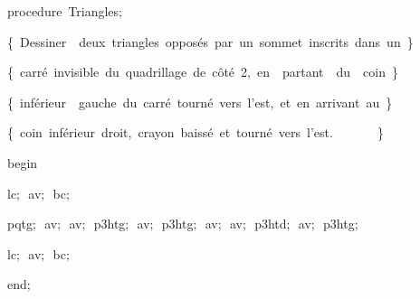 {\pagebreak[3] 
\vspace{\neglskip}\mbox{\blc  \blk\idt  \mcl procedure\idt \ Triangles$;$}\par 
\vspace{\neglskip}\mbox{\blc  \blk\blk\idt  \cmt  \{\ Dessiner\ \ deux\ triangles\ oppos\'{e}s\ par\ un\ sommet\ inscrits\ dans\ un\ \}\idt }\par 
\vspace{\neglskip}\mbox{\blc  \blk\blk\idt  \cmt  \{\ carr\'{e}\ invisible\ du\ quadrillage\ de\ c\^{o}t\'{e}\ 2,\ en\ \ partant\ \ du\ \ coin\ \}\idt }\par 
\vspace{\neglskip}\mbox{\blc  \blk\blk\idt  \cmt  \{\ inf\'{e}rieur\ \ gauche\ du\ carr\'{e}\ tourn\'{e}\ vers\ l{'}est,\ et\ en\ arrivant\ au\ \}\idt }\par 
\vspace{\neglskip}\mbox{\blc  \blk\blk\idt  \cmt  \{\ coin\ inf\'{e}rieur\ droit,\ crayon\ baiss\'{e}\ et\ tourn\'{e}\ vers\ l{'}est.\ \ \ \ \ \ \ \}\idt }\par 
\vspace{\neglskip}\mbox{\blc  \blk\idt  \mcl begin\idt }\par 
\vspace{\neglskip}\mbox{\blc  \blk\blk\idt  lc$;$\ av$;$\ bc$;$}\par 
\vspace{\neglskip}\mbox{\blc  \blk\blk\idt  pqtg$;$\ av$;$\ av$;$\ p3htg$;$\ av$;$\ p3htg$;$\ av$;$\ av$;$\ p3htd$;$\ av$;$\ p3htg$;$}\par 
\vspace{\neglskip}\mbox{\blc  \blk\blk\idt  lc$;$\ av$;$\ bc$;$\ }\par 
\vspace{\neglskip}\mbox{\blc  \blk\idt  \mcl end\idt $;$}\par 
\medskip

}
